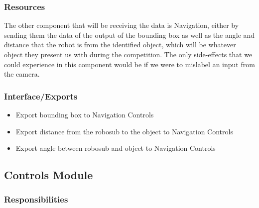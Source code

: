 \subsubsection{Resources}
\label{sec:resources}

The other component that will be receiving the data is Navigation, either by
sending them the data of the output of the bounding box as well as the angle
and distance that the robot is from the identified object, which will be
whatever object they present us with during the competition. The only
side-effects that we could experience in this component would be if we were to
mislabel an input from the camera.

\subsubsection{Interface/Exports}
\label{sec:exports}

\begin{itemize}
    \item Export bounding box to Navigation Controls 
    \item Export distance from the robosub to the object to Navigation Controls 
    \item Export angle between robosub and object to Navigation Controls 
\end{itemize}

\subsection{Controls Module}
\label{sec:controls_design}

\subsubsection{Responsibilities}
\label{sec:responsibilities}

